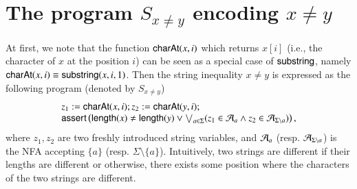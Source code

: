 

%


\section{The {\slint} program $S_{x \neq y}$ encoding $x \neq y$} \label{appendix:slint-prog-ineq}

At first, we note that the function $\mathsf{charAt}(x, i)$ which returns $x[i]$ (i.e., the character of $x$ at the position $i$) can be seen as a special case of $\mathsf{substring}$, namely $\mathsf{charAt}(x, i) \equiv \mathsf{substring}(x, i, 1)$. Then the string inequality $x \neq y$ is expressed as the following {\slint} program (denoted by $S_{x \neq y}$)
\[
\begin{array}{l}
z_1:=\mathsf{charAt}(x,i); z_2 := \mathsf{charAt}(y,i); \\
\textsf{assert}\left(\mathsf{length}(x) \neq \mathsf{length}(y) \vee \bigvee_{a \in \Sigma} (z_1 \in \mathcal{A}_a \wedge z_2 \in \mathcal{A}_{\Sigma \setminus a})\right),
\end{array}
\] 
where $z_1,z_2$ are two freshly introduced string variables, and $\mathcal{A}_a$ (resp. $\mathcal{A}_{\Sigma \setminus a}$) is the NFA accepting $\{a\}$ (resp. $\Sigma \setminus \{a\}$). Intuitively, two strings are different if their lengths are different or otherwise, there exists some position where the characters of the two strings are different.




